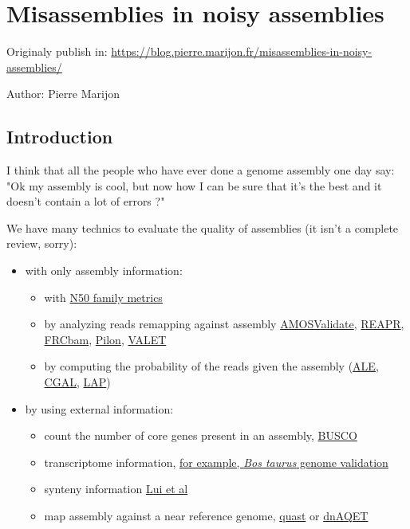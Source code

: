 \documentclass[./main.tex]{subfiles}
\begin{document}
\section{Misassemblies in noisy assemblies}

Originaly publish in: \url{https://blog.pierre.marijon.fr/misassemblies-in-noisy-assemblies/}

Author: Pierre Marijon

\subsection{Introduction}

I think that all the people who have ever done a genome assembly one day
say: "Ok my assembly is cool, but now how I can be sure that it's the
best and it doesn't contain a lot of errors ?"

We have many technics to evaluate the quality of assemblies (it isn't a
complete review, sorry):

\begin{itemize}
\item with only assembly information:
  \begin{itemize}
  \item with \href{https://doi.org/10.1089/cmb.2017.0013}{N50 family metrics}
  \item by analyzing reads remapping against assembly \href{http://amos.sourceforge.net/wiki/index.php/Amosvalidate}{AMOSValidate}, \href{https://www.sanger.ac.uk/science/tools/reapr}{REAPR}, \href{https://github.com/vezzi/FRC_align}{FRCbam}, \href{https://github.com/broadinstitute/pilon/wiki}{Pilon}, \href{https://www.cbcb.umd.edu/software/valet}{VALET}
  \item by computing the probability of the reads given the assembly (\href{https://doi.org/10.1093/bioinformatics/bts723}{ALE}, \href{https://doi.org/10.1186/gb-2013-14-1-r8}{CGAL}, \href{https://doi.org/10.1186/1756-0500-6-334}{LAP})
  \end{itemize}
\item by using external information:
  \begin{itemize}
  \item count the number of core genes present in an assembly, \href{https://busco.ezlab.org/}{BUSCO}
  \item transcriptome information, \href{https://doi.org/10.1186/gb-2009-10-4-r42}{for example, \emph{Bos taurus} genome validation}
  \item synteny information \href{https://doi.org/10.1186/s12859-018-2026-4}{Lui et al}
  \item map assembly against a near reference genome, \href{https://doi.org/10.1093/bioinformatics/btt086}{quast} or \href{https://bmcgenomics.biomedcentral.com/articles/10.1186/s12864-019-6070-x}{dnAQET}
  \end{itemize}
\end{itemize}
\end{document}
